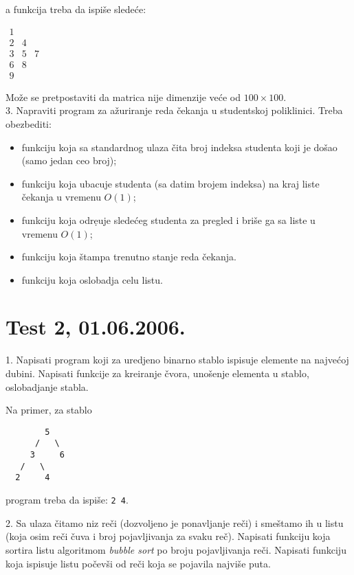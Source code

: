 a funkcija treba da ispi\v{s}e slede\'ce:

$\begin{array}{ccc}
1 &  & \\
2 &  4 & \\
3 & 5 & 7 \\
6 & 8 & \\
9 &  &
\end{array}$

Mo\v{z}e se pretpostaviti da matrica nije dimenzije ve\'ce od
$100 \times 100$. \\

3. Napraviti program za a\v{z}uriranje reda \v{c}ekanja u studentskoj
poliklinici. Treba obezbediti:

\begin{itemize}
\item funkciju koja sa standardnog ulaza \v{c}ita broj indeksa studenta
koji je do\v{s}ao (samo jedan ceo broj);
\item funkciju koja ubacuje studenta (sa datim brojem indeksa) na kraj
liste \v{c}ekanja u vremenu $O(1)$;
\item funkciju koja odre{\d}uje slede\'ceg studenta za pregled i bri\v{s}e
ga sa liste u vremenu $O(1)$;
\item funkciju koja \v{s}tampa trenutno stanje reda \v{c}ekanja.
\item funkciju koja oslobadja celu listu.
\end{itemize}




\section{Test 2, 01.06.2006.}



1. Napisati program koji za uredjeno binarno stablo ispisuje
elemente na najve\' coj dubini. Napisati funkcije za kreiranje
\v cvora, uno\v senje elementa u stablo, oslobadjanje stabla.

Na primer, za stablo

\begin{minipage}[t]{120mm}
\begin{verbatim}
        5
      /   \
     3     6
   /   \
  2     4
\end{verbatim}
\end{minipage}

\noindent
program treba da ispi\v se: {\tt 2 4}.

2. Sa ulaza \v citamo niz re\v ci (dozvoljeno je ponavljanje re\v ci) i
sme\v stamo ih u listu (koja osim re\v ci \v cuva i broj pojavljivanja
za svaku re\v c). Napisati funkciju koja sortira listu algoritmom
\emph{bubble sort} po broju pojavljivanja re\v ci. Napisati funkciju
koja ispisuje listu po\v cev\v si od re\v ci koja se pojavila najvi\v se puta.

